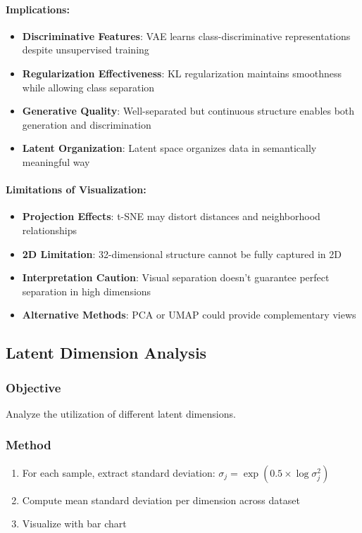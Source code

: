 \documentclass[conference]{IEEEtran}
\newcommand{\logvar}{\log \sigma^2}
\begin{document}
\paragraph{Implications:}
\begin{itemize}
    \item \textbf{Discriminative Features}: VAE learns class-discriminative representations despite unsupervised training
    \item \textbf{Regularization Effectiveness}: KL regularization maintains smoothness while allowing class separation
    \item \textbf{Generative Quality}: Well-separated but continuous structure enables both generation and discrimination
    \item \textbf{Latent Organization}: Latent space organizes data in semantically meaningful way
\end{itemize}

\paragraph{Limitations of Visualization:}
\begin{itemize}
    \item \textbf{Projection Effects}: t-SNE may distort distances and neighborhood relationships
    \item \textbf{2D Limitation}: 32-dimensional structure cannot be fully captured in 2D
    \item \textbf{Interpretation Caution}: Visual separation doesn't guarantee perfect separation in high dimensions
    \item \textbf{Alternative Methods}: PCA or UMAP could provide complementary views
\end{itemize}

\subsection{Latent Dimension Analysis}

\subsubsection{Objective}
Analyze the utilization of different latent dimensions.

\subsubsection{Method}
\begin{enumerate}
    \item For each sample, extract standard deviation: $\sigma_j = \exp(0.5 \times \logvar_j)$
    \item Compute mean standard deviation per dimension across dataset
    \item Visualize with bar chart
\end{enumerate}
\end{document}
